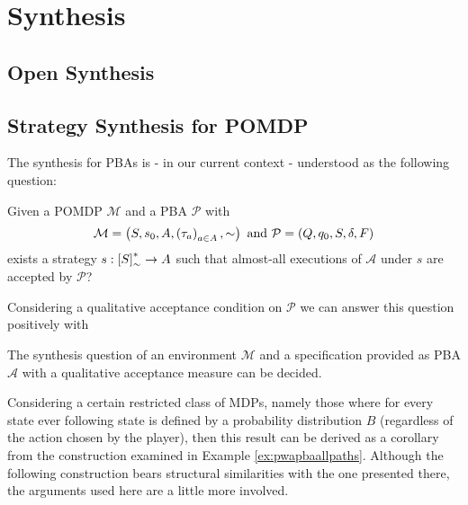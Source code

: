 \chapter{Synthesis}
\label{chapter:synthesis}
\section{Open Synthesis}

\section{Strategy Synthesis for \ac{POMDP}}

The synthesis for \acp{PBA} is - in our current context - understood as the
following question:
\begin{definition}
  Given a \ac{POMDP} $\mathcal{M}$ and a \ac{PBA} $\mathcal{P}$ with
  \begin{equation*}
    \mathcal{M} = \left(S, s_{0}, A, \left(\tau_{a}\right)_{a\in A}, \sim\right)
  \text{ and }
    \mathcal{P} = \left(Q, q_{0}, S, \delta, F\right)
  \end{equation*}
  exists a strategy $s:\left[S\right]_{\sim}^{*}\rightarrow A$ such that 
  almost-all executions of $\mathcal{A}$ under $s$ are accepted by 
  $\mathcal{P}$?
  \label{def:synthesis}
\end{definition}
Considering a qualitative acceptance condition on $\mathcal{P}$ we can answer
this question positively with
\begin{theorem}
  The synthesis question of an environment $\mathcal{M}$ and a specification
  provided as \ac{PBA} $\mathcal{A}$ with a qualitative acceptance measure
  can be decided.
  \label{thm:pbasynthesis}
\end{theorem}

Considering a certain restricted class of \acp{MDP}, namely those where for 
every state ever following state is defined by a probability distribution $B$
(regardless of the action chosen by the player), then this result can be 
derived as a corollary from the construction examined in Example 
\ref{ex:pwapbaallpaths}. Although the following construction bears structural
similarities with the one presented there, the arguments used here are a little 
more involved.

